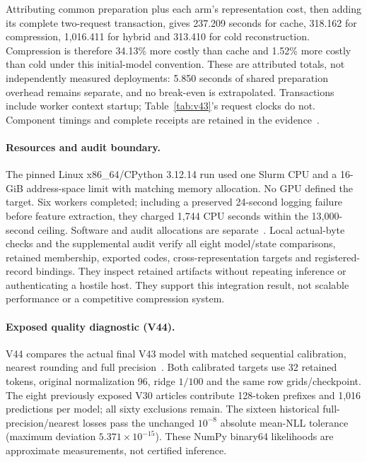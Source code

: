 \documentclass[10pt,twocolumn,letterpaper]{article}
\begin{document}
Attributing common preparation plus each arm's representation cost, then adding
its complete two-request transaction, gives 237.209 seconds for cache, 318.162
for compression, 1,016.411 for hybrid and 313.410 for cold reconstruction.
Compression is therefore 34.13\% more costly than cache and 1.52\% more costly
than cold under this initial-model convention. These are attributed totals,
not independently measured deployments: 5.850 seconds of shared preparation
overhead remains separate, and no break-even is extrapolated. Transactions
include worker context startup; Table~\ref{tab:v43}'s request clocks do not.
Component timings and complete receipts are retained in the evidence~\cite{v43}.

\paragraph{Resources and audit boundary.}
The pinned Linux x86\_64/CPython 3.12.14 run used one Slurm CPU and a 16-GiB
address-space limit with matching memory allocation. No GPU defined the target.
Six workers completed; including a preserved 24-second logging failure before
feature extraction, they charged 1,744 CPU seconds within the 13,000-second
ceiling. Software and audit allocations are separate~\cite{v43}.
Local actual-byte checks and the supplemental audit verify all eight model/state
comparisons, retained membership, exported codes, cross-representation targets
and registered-record bindings. They inspect retained artifacts without repeating
inference or authenticating a hostile host. They support this integration result,
not scalable performance or a competitive compression system.

\paragraph{Exposed quality diagnostic (V44).}
V44 compares the actual final V43 model with matched sequential calibration,
nearest rounding and full precision~\cite{v44}. Both calibrated targets use
32 retained tokens, original normalization 96, ridge $1/100$ and the same row
grids/checkpoint. The eight previously exposed V30 articles contribute 128-token
prefixes and 1,016 predictions per model; all sixty exclusions remain.
The sixteen historical full-precision/nearest losses pass the unchanged
$10^{-8}$ absolute mean-NLL tolerance (maximum deviation
$5.371\times10^{-15}$). These NumPy binary64 likelihoods are approximate
measurements, not certified inference.
\end{document}
